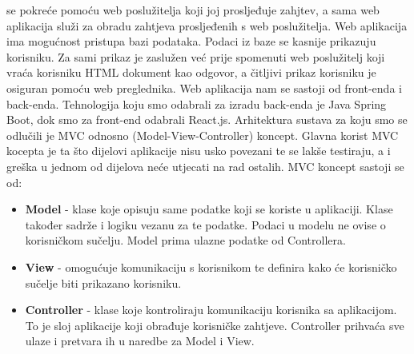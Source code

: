 	\indent {} se pokreće pomoću web poslužitelja koji joj prosljeđuje zahjtev, a sama web aplikacija služi za obradu zahtjeva prosljeđenih s web poslužitelja. Web aplikacija ima mogućnost pristupa bazi podataka. Podaci iz baze se kasnije prikazuju korisniku. Za sami prikaz je zaslužen već prije spomenuti web poslužitelj koji vraća korisniku HTML dokument kao odgovor, a čitljivi prikaz korisniku je osiguran pomoću web preglednika. \newline
	\indent Web aplikacija nam se sastoji od front-enda i back-enda. Tehnologija koju smo odabrali za izradu back-enda je Java Spring Boot, dok smo za front-end odabrali React.js. Arhitektura sustava za koju smo se odlučili je MVC odnosno (Model-View-Controller) koncept. \newline
	\indent Glavna korist MVC kocepta je ta što dijelovi aplikacije nisu usko povezani te se lakše testiraju, a i greška u jednom od dijelova neće utjecati na rad ostalih. \newline
	MVC koncept sastoji se od:
	\begin{itemize}
		\item   \textbf{Model} - klase koje opisuju same podatke koji se koriste u aplikaciji. Klase također sadrže i logiku vezanu za te podatke. Podaci u modelu ne ovise o korisničkom sučelju. Model prima ulazne podatke od Controllera.
		\item 	\textbf{View} - omogućuje komunikaciju s korisnikom te definira kako će korisničko sučelje biti prikazano korisniku.
		\item 	\textbf{Controller}	- klase koje kontroliraju komunikaciju korisnika sa aplikacijom. To je sloj aplikacije koji obrađuje korisničke zahtjeve. Controller prihvaća sve ulaze i pretvara ih u naredbe za Model i View.   	
	\end{itemize}

	

